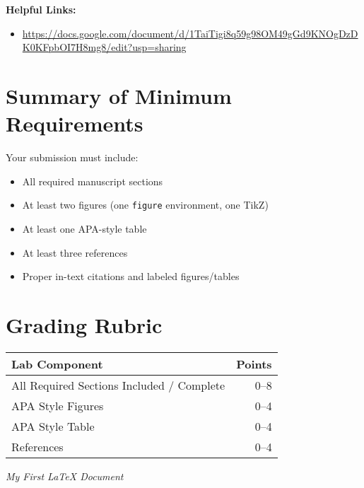 \documentclass[11pt]{article}
\begin{document}
\vspace{1em}
\noindent\textbf{Helpful Links:}
\begin{itemize}[leftmargin=2em]
    \item \url{https://docs.google.com/document/d/1TaiTigi8q59g98OM49gGd9KNOgDzDK0KFpbOI7H8mg8/edit?usp=sharing}
\end{itemize}

\section*{Summary of Minimum Requirements}
Your submission must include:
\begin{itemize}
    \item All required manuscript sections
    \item At least two figures (one \texttt{figure} environment, one TikZ)
    \item At least one APA-style table
    \item At least three references
    \item Proper in-text citations and labeled figures/tables
\end{itemize}

\section*{Grading Rubric}
\begin{tabular}{@{}p{10cm}r@{}}
\toprule
\textbf{Lab Component} & \textbf{Points} \\
\midrule
All Required Sections Included / Complete & 0--8 \\
APA Style Figures & 0--4 \\
APA Style Table & 0--4 \\
References & 0--4 \\
\bottomrule
\end{tabular}

\vfill
\begin{center}
    \small\textit{My First \LaTeX{} Document}
\end{center}
\end{document}
